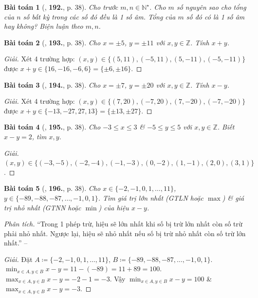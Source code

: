 \documentclass{article}
\numberwithin{equation}{section}
\newtheorem{baitoan}{Bài toán}
\begin{document}
\begin{baitoan}[\cite{Tuyen_Toan_6}, \textbf{192.}, p. 38]
	Cho trước $m,n\in\mathbb{N}^\star$. Cho $m$ số nguyên sao cho tổng của $n$ số bất kỳ trong các số đó đều là 1 số âm. Tổng của $m$ số đó có là 1 số âm hay không? Biện luận theo $m,n$.
\end{baitoan}

\begin{baitoan}[\cite{Tuyen_Toan_6}, \textbf{193.}, p. 38]
	Cho $x = \pm5$, $y = \pm11$ với $x,y\in\mathbb{Z}$. Tính $x + y$.
\end{baitoan}

\begin{proof}[Giải]
	Xét 4 trường hợp: $(x,y)\in\{(5,11),(-5,11),(5,-11),(-5,-11)\}$ được $x + y\in\{16,-16,-6,6\} = \{\pm6,\pm16\}$.
\end{proof}

\begin{baitoan}[\cite{Tuyen_Toan_6}, \textbf{194.}, p. 38]
	Cho $x = \pm7$, $y = \pm20$ với $x,y\in\mathbb{Z}$. Tính $x - y$.
\end{baitoan}

\begin{proof}[Giải]
	Xét 4 trường hợp: $(x,y)\in\{(7,20),(-7,20),(7,-20),(-7,-20)\}$ được $x + y\in\{-13,-27,27,13\} = \{\pm13,\pm27\}$.
\end{proof}

\begin{baitoan}[\cite{Tuyen_Toan_6}, \textbf{195.}, p. 38]
	Cho $-3\le x\le3$ \& $-5\le y\le5$ với $x,y\in\mathbb{Z}$. Biết $x - y = 2$, tìm $x,y$.
\end{baitoan}

\begin{proof}[Giải]
	$(x,y)\in\{(-3,-5),(-2,-4),(-1,-3),(0,-2),(1,-1),(2,0),(3,1)\}$.
\end{proof}

\begin{baitoan}[\cite{Tuyen_Toan_6}, \textbf{196.}, p. 38]
	Cho $x\in\{-2,-1,0,1,\ldots,11\}$, $y\in\{-89,-88,-87,\ldots,-1,0,1\}$. Tìm giá trị lớn nhất (GTLN hoặc $\max$) \& giá trị nhỏ nhất (GTNN hoặc $\min$) của hiệu $x - y$.
\end{baitoan}
\noindent\textit{Phân tích.} ``Trong 1 phép trừ, hiệu sẽ lớn nhất khi số bị trừ lớn nhất còn số trừ phải nhỏ nhất. Ngược lại, hiệu sẽ nhỏ nhất nếu số bị trừ nhỏ nhất còn số trừ lớn nhất.'' -- \cite[p. 130]{Tuyen_Toan_6}

\begin{proof}[Giải]
	Đặt $A\coloneqq\{-2,-1,0,1,\ldots,11\}$, $B\coloneqq\{-89,-88,-87,\ldots,-1,0,1\}$. $\min_{x\in A,y\in B} x - y = 11 - (-89) = 11 + 89 = 100$. $\max_{x\in A,y\in B} x - y = -2 - 1 = -3$. Vậy $\min_{x\in A,y\in B} x - y = 100$ \& $\max_{x\in A,y\in B} x - y = -3$.
\end{proof}
\end{document}
